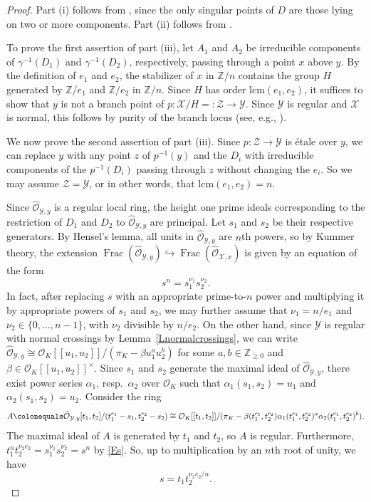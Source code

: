 \documentclass[12pt]{amsart}
\numberwithin{equation}{section}
\theoremstyle{definition}
\newcommand{\mc}[1]{\mathcal{#1}}
\newcommand{\ints}{\mathbb Z}
\DeclareMathOperator{\Frac}{Frac}
\begin{document}
\begin{proof}
Part (i) follows from \cite[Theorem 1.5]{KWsuper}, since the only
singular points of $D$ are those lying on two or more components.
Part (ii) follows from \cite[Proposition 2.8(i)]{OSNew}.

To prove the first assertion of part (iii), let $A_1$ and $A_2$ be irreducible components of
$\gamma^{-1}(D_1)$ and $\gamma^{-1}(D_2)$, respectively, passing
through a point $x$ above $y$.  By the definition of $e_1$ and $e_2$, the stabilizer of $x$ in $\ints/n$ contains the
group $H$ generated by $\ints/e_1$ and $\ints/e_2$ in $\ints/n$.
Since $H$ has
order lcm$(e_1, e_2)$, it suffices to show that $y$ is not a branch
point of $p \colon \mc{X}/H =: \mc{Z} \to \mc{Y}$.  Since $\mc{Y}$ is regular and
$\mc{X}$ is normal, this follows by purity of the branch locus (see, 
e.g., \cite[Theorem 5.2.13]{Szamuely}).

We now prove the second assertion of part (iii).  Since $p \colon \mc{Z} \to \mc{Y}$
is \'{e}tale over $y$, we can replace $y$ with any point $z$ of
$p^{-1}(y)$ and the $D_i$ with irreducible components of the
$p^{-1}(D_i)$ passing through $z$ without changing the $e_i$. So
we may assume $\mc{Z} = \mc{Y}$, or in other words, that lcm$(e_1, e_2) = n$.

Since $\hat{\mc{O}}_{\mc{Y}, y}$ is a regular local ring, 
the height one prime ideals corresponding to the restriction of $D_1$
and $D_2$ to $\hat{\mc{O}}_{\mc{Y}, y}$ are principal.  Let $s_1$ and
$s_2$ be their respective generators. By Hensel's lemma, all units in
$\hat{\mc{O}}_{\mc{Y}, y}$ are $n$th powers, so by Kummer theory, the extension
$\Frac(\hat{\mc{O}}_{\mc{Y}, y}) \hookrightarrow \Frac(\hat{\mc{O}}_{\mc{X}, x})$ is
given by an equation of the form
\begin{equation}\label{Es}
  s^n = s_1^{\nu_1}s_2^{\nu_2}.
\end{equation}
In fact, after replacing $s$
with an appropriate prime-to-$n$ power and multiplying it by
appropriate powers of $s_1$ and $s_2$, we may further assume that $\nu_1 =
n/e_1$ and $\nu_2 \in \{0, \ldots, n-1\}$, with $\nu_2$ divisible by
$n/e_2$.  On the other hand, since $\mc{Y}$ is regular with normal
crossings by Lemma~\ref{Lnormalcrossings}, we can write $\hat{\mc{O}}_{\mc{Y},y} \cong
\mc{O}_K[[u_1, u_2]]/(\pi_K - \beta u_1^au_2^b)$ for some $a, b \in
\ints_{\geq 0}$ and $\beta \in \mc{O}_K[[u_1,u_2]]^{\times}$.  Since $s_1$
and $s_2$ generate the maximal ideal of $\hat{\mc{O}}_{\mc{Y},y}$, there exist power series $\alpha_1$, resp.\ $\alpha_2$ 
over $\mc{O}_K$ such that $\alpha_1(s_1, s_2) =  u_1$ and
$\alpha_2(s_1, s_2) = u_2$.
Consider the ring
$$A \colonequals \hat{\mc{O}}_{\mc{Y}, y}[t_1,t_2]/(t_1^{e_1} - s_1, t_2^{e_2} -
s_2) \cong \mc{O}_K[[t_1, t_2]]/(\pi_K - \beta(t_1^{e_1},t_2^{e_2}) \alpha_1(t_1^{e_1},t_2^{e_2})^{a}\alpha_2(t_1^{e_1},t_2^{e_2})^{b}).$$  The maximal ideal of $A$ is
generated by $t_1$ and $t_2$, so $A$ is regular.  Furthermore,
$t_1^nt_2^{\nu_2e_2} = s_1^{\nu_1}s_2^{\nu_2} = s^n$ by \eqref{Es}.   So, up to
multiplication by an $n$th root of unity, we have
\begin{equation}\label{Ealternates}
  s = t_1t_2^{\nu_2e_2/n}.
\end{equation}


\end{proof}
\end{document}
